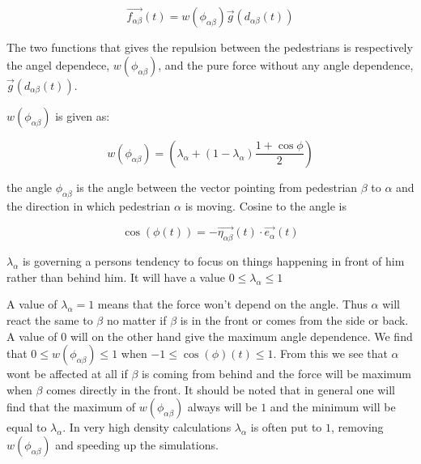 \begin{equation}
        \overrightarrow{f_{\alpha \beta }}\left( t \right) = w\left(\phi_{\alpha \beta}\right)\overrightarrow{g}\left(d_{\alpha \beta}(t)\right)
    \label{eq:pedestrianinteraction}
\end{equation}

The two functions that gives the repulsion between the pedestrians is respectively the angel dependece, $ w\left(\phi_{\alpha \beta}\right)$, and the pure force without any angle dependence, $\overrightarrow{g}\left(d_{\alpha \beta}(t)\right)$.

$ w\left(\phi_{\alpha \beta}\right)$ is given as: 

\begin{equation}
    w\left(\phi_{\alpha \beta}\right)=
    \left(
        \lambda_{\alpha} + \left(
            1 - \lambda_{\alpha}
        \right)
		\frac{1+\cos{\phi}}{2}
    \right) 
    \label{angleAB}
\end{equation}

the angle $\phi_{\alpha \beta}$ is the angle between the 
vector pointing from pedestrian $\beta$ to $\alpha$ and the direction in which 
pedestrian $\alpha$ is moving. Cosine to the angle is 

\begin{equation}
\cos \left( \phi \left( t \right) \right)
		= 
	- \overrightarrow{\eta_{\alpha \beta}}
		\left( t \right) 
	\cdot 
\overrightarrow{e_{\alpha}}\left( t \right)
\end{equation}

$\lambda_{\alpha}$ is governing a persons tendency to focus on things happening in front of him 
rather than behind him. It will have a value  $0\leq \lambda_{\alpha}\leq 1$

A value of $\lambda_{\alpha}=1$ means that the force won't depend on the angle. Thus $\alpha$ will react the same to $\beta$ no matter if $\beta$ is in the front or comes from the side or back. A value of $0$ will on the other hand give the maximum angle dependence. We find that $0\leq w\left(\phi_{\alpha \beta}\right)\leq1$ when $-1 \leq \cos \left( \phi \right) \left( t \right) \leq 1$. From this we see that $\alpha$ wont be affected at all if $\beta$ is coming from behind and the force will be maximum when $\beta$ comes directly in the front. It should be noted that in general one will find that the maximum of $w\left(\phi_{\alpha \beta}\right)$ always will be $1$ and the minimum will be equal to $\lambda_{\alpha}$. In very high density calculations $\lambda_{\alpha}$ is often put to $1$, removing $w(\phi_{\alpha \beta})$ and speeding up the simulations.   

